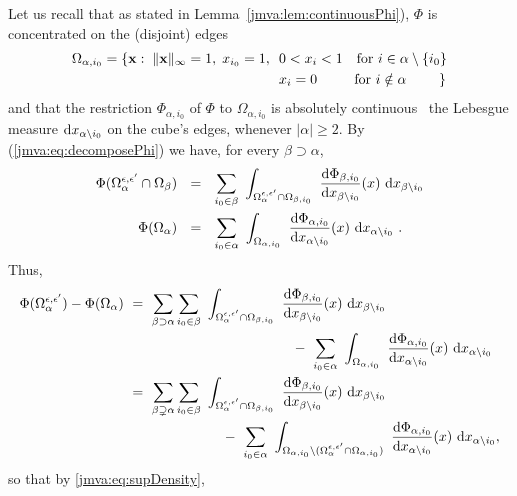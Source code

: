 Let us recall that as stated in Lemma~\ref{jmva:lem:continuousPhi}), $ \Phi$ is concentrated on the (disjoint) edges 
\begin{align*}
   \Omega_{\alpha,i_0} = \{\mathbf x: \; \| {\mathbf x}\|_{\infty}  = 1,\; x_{i_0} = 1,~~& 0<  x_i < 1 ~~\text{~for~} i \in \alpha \setminus \{i_0\}\\
&x_i=0 ~~~~\text{~~~ for } i\notin \alpha ~~~~~~~\}
\end{align*}
and that the restriction $\Phi_{\alpha,i_0}$ of $\Phi$ to $\Omega_{\alpha,i_0}$ is absolutely continuous \wrt~the Lebesgue measure $\mathrm{d} x_{\alpha\setminus{i_0}}$ on the cube's edges, whenever $|\alpha|\ge 2 $.
\noindent
By (\ref{jmva:eq:decomposePhi}) we have, for every $\beta \supset \alpha$, 
\begin{align*}
\Phi(\Omega_\alpha^{\epsilon, \epsilon'} \cap \Omega_{\beta})~~&=~~ \sum_{i_0 \in \beta} ~\int_{\Omega_\alpha^{\epsilon, \epsilon'} \cap \Omega_{\beta,i_0}}  ~\frac{\mathrm{d} \Phi_{\beta,i_0}}{\mathrm{d} x_{ \beta \setminus i_0}}(x) ~\mathrm{d} x_{\beta \setminus i_0}\\
\Phi(\Omega_\alpha)~~&=~~ \sum_{i_0 \in \alpha} ~\int_{\Omega_{\alpha,i_0}}  ~\frac{\mathrm{d} \Phi_{\alpha,i_0}}{\mathrm{d} x_{ \alpha \setminus i_0}}(x) ~\mathrm{d} x_{\alpha \setminus i_0}~.
\end{align*}
Thus,
\begin{align*}
\Phi(\Omega_\alpha^{\epsilon, \epsilon'}) - \Phi(\Omega_\alpha) &~=~ \sum_{\beta \supset \alpha} \sum_{i_0 \in \beta} ~\int_{\Omega_\alpha^{\epsilon, \epsilon'} \cap \Omega_{\beta,i_0}}  ~\frac{\mathrm{d} \Phi_{\beta,i_0}}{\mathrm{d} x_{ \beta \setminus i_0}}(x) ~\mathrm{d} x_{\beta \setminus i_0}\\
&~~~~~~~~~~~~~~~~~~~~~~~~~~~~~~~~~~~~-~\sum_{i_0 \in \alpha} ~\int_{\Omega_{\alpha,i_0}}  ~\frac{\mathrm{d} \Phi_{\alpha,i_0}}{\mathrm{d} x_{ \alpha \setminus i_0}}(x) ~\mathrm{d} x_{\alpha \setminus i_0}\\
&~=~ \sum_{\beta \supsetneq \alpha} \sum_{i_0 \in \beta} ~\int_{\Omega_\alpha^{\epsilon, \epsilon'} \cap \Omega_{\beta,i_0}}  ~\frac{\mathrm{d} \Phi_{\beta,i_0}}{\mathrm{d} x_{ \beta \setminus i_0}}(x) ~\mathrm{d} x_{\beta \setminus i_0}\\
&~~~~~~~~~~~~~~~~~~~~~-~\sum_{i_0 \in \alpha} ~\int_{\Omega_{\alpha,i_0} \setminus (\Omega_\alpha^{\epsilon, \epsilon'} \cap \Omega_{\alpha,i_0})}  ~\frac{\mathrm{d} \Phi_{\alpha,i_0}}{\mathrm{d} x_{ \alpha \setminus i_0}}(x) ~\mathrm{d} x_{\alpha \setminus i_0},
\end{align*}
so that by \eqref{jmva:eq:supDensity}, 
